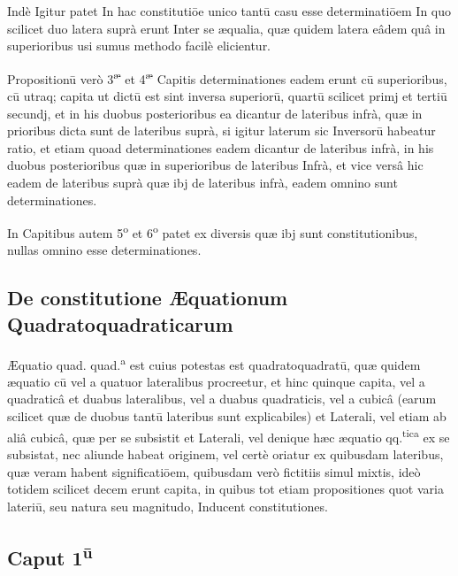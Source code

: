 \documentclass[11pt,a4paper]{article}
\begin{document}
Indè Igitur patet In hac constitutiōe unico tantū casu esse determinatiōem In quo scilicet duo latera suprà erunt Inter se æqualia, quæ quidem latera eâdem quâ in superioribus usi sumus methodo facilè elicientur.

Propositionū verò 3\textsuperscript{æ} et 4\textsuperscript{æ} Capitis determinationes eadem erunt cū superioribus, cū utraq; capita ut dictū est sint inversa superiorū, quartū scilicet primj et tertiū secundj, et in his duobus posterioribus ea dicantur de lateribus infrà, quæ in prioribus dicta sunt de lateribus suprà, si igitur laterum sic Inversorū habeatur ratio, et etiam quoad determinationes eadem dicantur de lateribus infrà, in his duobus posterioribus quæ in superioribus de lateribus Infrà, et vice versâ hic eadem de lateribus suprà quæ ibj de lateribus infrà, eadem omnino sunt determinationes.

In Capitibus autem 5\textsuperscript{o} et 6\textsuperscript{o} patet ex diversis quæ ibj sunt constitutionibus, nullas omnino esse determinationes.


\subsection*{De constitutione Æquationum Quadratoquadraticarum}

Æquatio quad. quad.\textsuperscript{a} est cuius potestas est quadratoquadratū, quæ quidem æquatio cū vel a quatuor lateralibus procreetur, et hinc quinque capita, vel a quadraticâ et duabus lateralibus, vel a duabus quadraticis, vel a cubicâ (earum scilicet quæ de duobus tantū lateribus sunt explicabiles) et Laterali, vel etiam ab aliâ cubicâ, quæ per se subsistit et Laterali, vel denique hæc æquatio qq.\textsuperscript{tica} ex se subsistat, nec aliunde habeat originem, vel certè oriatur ex quibusdam lateribus, quæ veram habent significatiōem, quibusdam verò  fictitiis simul mixtis, ideò totidem scilicet decem erunt capita, in quibus tot etiam propositiones quot varia lateriū, seu natura seu magnitudo, Inducent constitutiones.

\subsection*{Caput 1\textsuperscript{ū}}
\end{document}
